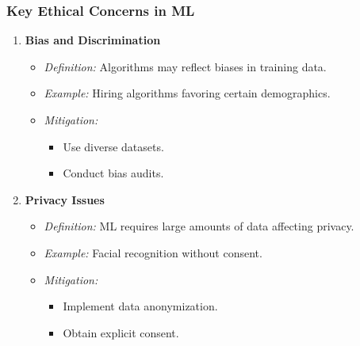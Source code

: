 \documentclass[aspectratio=169]{beamer}
\begin{document}
\begin{frame}[fragile]
    \frametitle{Key Ethical Concerns in ML}
    \begin{enumerate}
        \item \textbf{Bias and Discrimination}
            \begin{itemize}
                \item \textit{Definition:} Algorithms may reflect biases in training data.
                \item \textit{Example:} Hiring algorithms favoring certain demographics.
                \item \textit{Mitigation:}
                    \begin{itemize}
                        \item Use diverse datasets.
                        \item Conduct bias audits.
                    \end{itemize}
            \end{itemize}

        \item \textbf{Privacy Issues}
            \begin{itemize}
                \item \textit{Definition:} ML requires large amounts of data affecting privacy.
                \item \textit{Example:} Facial recognition without consent.
                \item \textit{Mitigation:}
                    \begin{itemize}
                        \item Implement data anonymization.
                        \item Obtain explicit consent.
                    \end{itemize}
            \end{itemize}
    \end{enumerate}
\end{frame}
\end{document}
